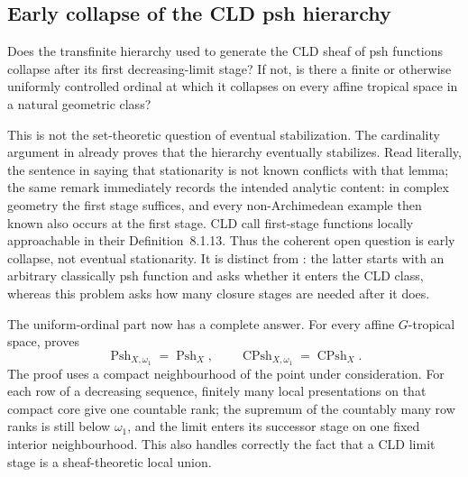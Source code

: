 \subsection{Early collapse of the CLD psh hierarchy}

\begin{problem}\label{prob:frontier-cld-hierarchy}
Does the transfinite hierarchy used to generate the CLD sheaf of psh
functions collapse after its first decreasing-limit stage?  If not, is there
a finite or otherwise uniformly controlled ordinal at which it collapses on
every affine tropical space in a natural geometric class?
\end{problem}

This is not the set-theoretic question of eventual stabilization.  The
cardinality argument in \cite[Lemma~8.1.4]{CLD25} already proves that the
hierarchy eventually stabilizes.  Read literally, the sentence in
\cite[Remark~8.1.6]{CLD25} saying that stationarity is not known conflicts
with that lemma; the same remark immediately records the intended analytic
content: in complex geometry the first stage suffices, and every
non-Archimedean example then known also occurs at the first stage.  CLD call
first-stage functions locally approachable in their Definition~8.1.13.
Thus the coherent open question is early collapse, not eventual
stationarity.  It is distinct from
: the latter starts with an
arbitrary classically psh function and asks whether it enters the CLD class,
whereas this problem asks how many closure stages are needed after it does.

The uniform-ordinal part now has a complete answer.  For every affine
$G$-tropical space,
 proves
\[
 \operatorname{Psh}_{X,\omega_1}=\operatorname{Psh}_X,
 \qquad
 \operatorname{CPsh}_{X,\omega_1}=\operatorname{CPsh}_X.
\]
The proof uses a compact neighbourhood of the point under consideration.
For each row of a decreasing sequence, finitely many local presentations on
that compact core give one countable rank; the supremum of the countably many
row ranks is still below $\omega_1$, and the limit enters its successor
stage on one fixed interior neighbourhood.  This also handles correctly the
fact that a CLD limit stage is a sheaf-theoretic local union.

